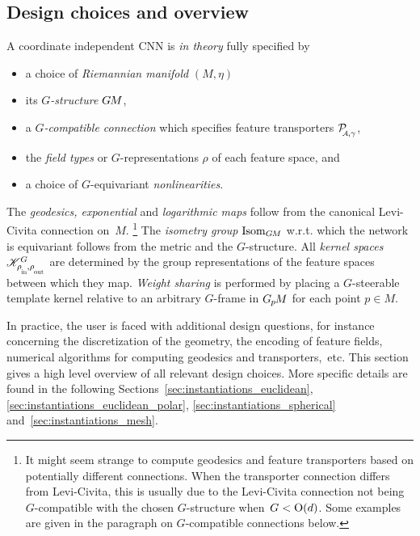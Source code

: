 \newpage %








\subsection*{Design choices and overview}
\label{sec:instantiations_taxonomy}

A coordinate independent CNN is \emph{in theory} fully specified by
\begin{itemize}
    \item[1)] a choice of \emph{Riemannian manifold} $(M,\eta)$
    \item[2)] its \emph{$G$-structure} $G\mkern-1.4muM$,
    \item[3)] a \emph{$G$-compatible connection} which specifies feature transporters $\PAgamma$,
    \item[4)] the \emph{field types} or $G$-representations $\rho$ of each feature space, and
    \item[5)] a choice of $G$-equivariant \emph{nonlinearities}.
\end{itemize}
The \emph{geodesics, exponential} and \emph{logarithmic maps} follow from the canonical Levi-Civita connection on~$M$.%
\footnote{
    It might seem strange to compute geodesics and feature transporters based on potentially different connections.
    When the transporter connection differs from Levi-Civita, this is usually due to the Levi-Civita connection not being $G$-compatible with the chosen $G$-structure when~$G<\operatorname{O}(d)$.
    Some examples are given in the paragraph on $G$-compatible connections below.
}
The \emph{isometry group} $\operatorname{Isom}_{G\mkern-1.4muM}$ w.r.t. which the network is equivariant follows from the metric and the $G$-structure.
All \emph{kernel spaces} $\KG$ are determined by the group representations of the feature spaces between which they map.
\emph{Weight sharing} is performed by placing a $G$-steerable template kernel relative to an arbitrary $G$-frame in $G_{\mkern-1.3mu p}\mkern-1.2muM$ for each point $p\in M$.

In practice, the user is faced with additional design questions, for instance concerning the discretization of the geometry, the encoding of feature fields, numerical algorithms for computing geodesics and transporters,~etc.
This section gives a high level overview of all relevant design choices.
More specific details are found in the following Sections~\ref{sec:instantiations_euclidean}, \ref{sec:instantiations_euclidean_polar}, \ref{sec:instantiations_spherical} and~\ref{sec:instantiations_mesh}.



